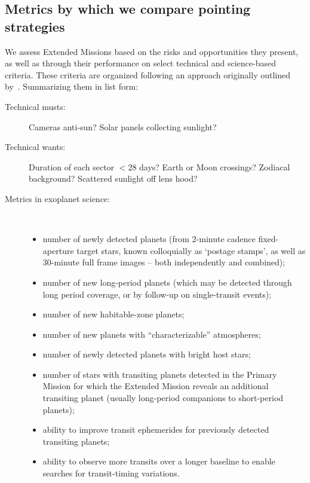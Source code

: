 \subsection{Metrics by which we compare pointing strategies}
\label{sec:comparing_pointing_strategies}

We assess Extended Missions based on the risks and opportunities they
present, as well as through their performance on select technical and
science-based criteria.  These criteria are organized following an
approach originally outlined by~\citet{kepner_rational_1965}.
Summarizing them in list form:
\begin{description}
\item[Technical musts:] Cameras anti-sun? Solar panels collecting sunlight?
\item[Technical wants:] Duration of each sector $<28$ days? Earth or Moon crossings? Zodiacal background? Scattered sunlight off lens hood?
\item[Metrics in exoplanet science:]\
	\begin{itemize}
	\item number of newly detected planets (from 2-minute cadence fixed-aperture target stars, known colloquially as `postage stamps', as well as 30-minute full frame images -- both independently and combined); 
	\item number of new long-period planets (which may be detected through long period coverage, or by follow-up on single-transit events); 
	\item number of new habitable-zone planets; 
	\item number of new planets with ``characterizable'' atmospheres; 
	\item number of newly detected planets with bright host stars; 
	\item number of stars with transiting planets detected in the Primary Mission for which the Extended Mission reveals an additional
          transiting planet (usually long-period companions to short-period planets);
        \item ability to improve transit ephemerides for previously detected transiting planets;
	\item ability to observe more transits over a longer baseline to enable searches for transit-timing variations.
        \end{itemize}
\end{description}

